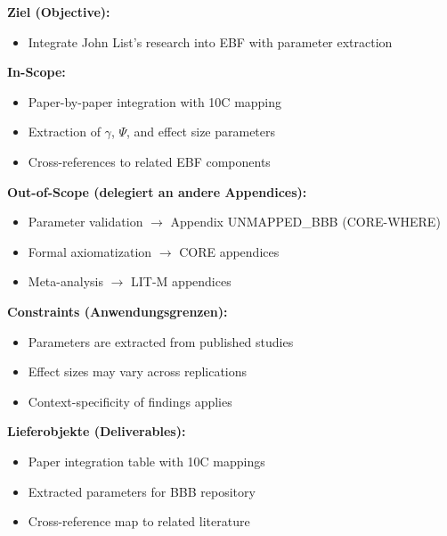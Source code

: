 
\begin{tcolorbox}[
    colback=orange!5!white,
    colframe=orange!75!black,
    title={\textbf{Appendix Scope: Ziel / In-Scope / Out-of-Scope / Constraints}},
    fonttitle=\bfseries
]

\textbf{Ziel (Objective):}
\begin{itemize}[nosep]
    \item Integrate John List's research into EBF with parameter extraction
\end{itemize}

\textbf{In-Scope:}
\begin{itemize}[nosep]
    \item Paper-by-paper integration with 10C mapping
    \item Extraction of $\gamma$, $\Psi$, and effect size parameters
    \item Cross-references to related EBF components
\end{itemize}

\textbf{Out-of-Scope (delegiert an andere Appendices):}
\begin{itemize}[nosep]
    \item Parameter validation $\rightarrow$ Appendix UNMAPPED_BBB (CORE-WHERE)
    \item Formal axiomatization $\rightarrow$ CORE appendices
    \item Meta-analysis $\rightarrow$ LIT-M appendices
\end{itemize}

\textbf{Constraints (Anwendungsgrenzen):}
\begin{itemize}[nosep]
    \item Parameters are extracted from published studies
    \item Effect sizes may vary across replications
    \item Context-specificity of findings applies
\end{itemize}

\textbf{Lieferobjekte (Deliverables):}
\begin{itemize}[nosep]
    \item Paper integration table with 10C mappings
    \item Extracted parameters for BBB repository
    \item Cross-reference map to related literature
\end{itemize}

\end{tcolorbox}

